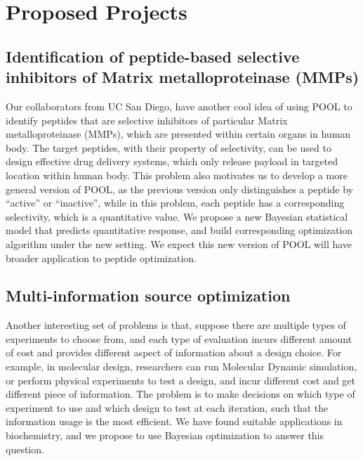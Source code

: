 \documentclass[11pt]{article}
\begin{document}
\section{Proposed Projects}
\subsection{Identification of peptide-based selective inhibitors of Matrix 
metalloproteinase (MMPs)}
Our collaborators from UC San Diego, have another cool idea of using POOL
to identify peptides that are selective inhibitors of particular Matrix 
metalloproteinase (MMPs), which are presented within certain organs in human body. 
The target peptides, with their property of selectivity, can be used to design 
effective drug delivery systems, which only release payload in targeted location
within human body. This problem also motivates us to develop a more general
version of POOL, as the previous version only distinguishes a peptide by
\enquote{active} or \enquote{inactive}, while in this problem, each peptide
has a corresponding selectivity, which is a quantitative value. We propose a new
Bayesian statistical model that predicts quantitative response, and build
corresponding optimization algorithm under the new setting. We expect this new
version of POOL will have broader application to peptide optimization.


\subsection{Multi-information source optimization}
Another interesting set of problems is that, suppose there are multiple types of
experiments to choose from, and each type of evaluation incurs different amount of 
cost and provides different aspect of information about a design choice. For example, 
in molecular design, researchers can run Molecular Dynamic simulation, or perform 
physical experiments to test a design, and incur different cost and get different
piece of information. The problem is to make decisions on which type of experiment
to use and which design to test at each iteration, such that the information usage 
is the most efficient. We have found suitable applications
in biochemistry, and we propose to use Bayesian optimization to 
answer this question.


\end{document}
